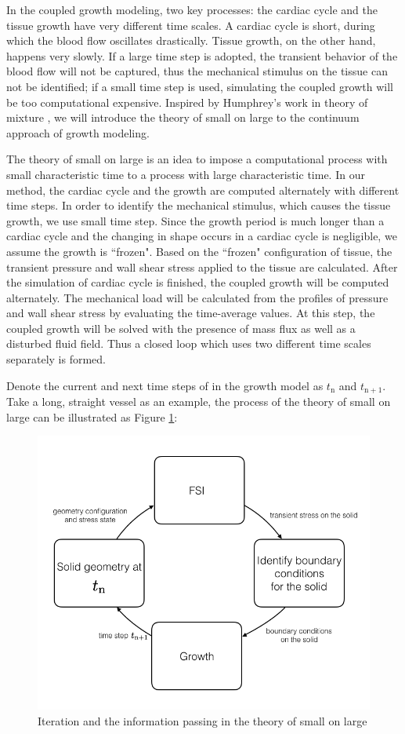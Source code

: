 In the coupled growth modeling, two key processes: the cardiac cycle and the tissue growth have very different time scales. A cardiac cycle is short, during which the blood flow oscillates drastically. Tissue growth, on the other hand, happens very slowly. If a large time step is adopted, the transient behavior of the blood flow will not be captured, thus the mechanical stimulus on the tissue can not be identified; if a small time step is used, simulating the coupled growth will be too computational expensive. Inspired by Humphrey's work in theory of mixture \cite{Baek}, we will introduce the theory of small on large to the continuum approach of growth modeling.

The theory of small on large is an idea to impose a computational process with small characteristic time to a process with large characteristic time. In our method, the cardiac cycle and the growth are computed alternately with different time steps. In order to identify the mechanical stimulus, which causes the tissue growth, we use small time step. Since the growth period is much longer than a cardiac cycle and the changing in shape occurs in a cardiac cycle is negligible, we assume the growth is ``frozen". Based on the ``frozen" configuration of tissue, the transient pressure and wall shear stress applied to the tissue are calculated. After the simulation of cardiac cycle is finished, the coupled growth will be computed alternately. The mechanical load will be calculated from the profiles of pressure and wall shear stress by evaluating the time-average values. At this step, the coupled growth will be solved with the presence of mass flux as well as a disturbed fluid field. Thus a closed loop which uses two different time scales separately is formed.

Denote the current and next time steps of in the growth model as $t_\mathrm{n}$ and $t_\mathrm{n+1}$. Take a long, straight vessel as an example, the process of the theory of small on large can be illustrated as Figure \ref{fig:smallOnLarge}:
\begin{figure}[H]
   \centering
   \includegraphics[width=.4\textwidth]{./figs/smallOnLarge.png} %
   \caption{Iteration and the information passing in the theory of small on large}
   \label{fig:smallOnLarge}
\end{figure}

